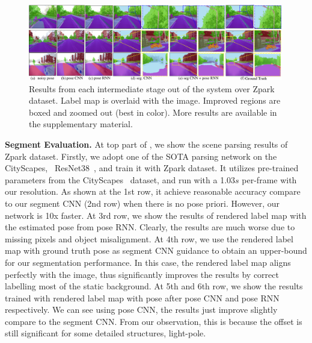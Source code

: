 \begin{figure}[!htbp]
\center
\vspace{-0.3\baselineskip}
\includegraphics[width=0.99\textwidth]{fig/results_v2.png}
   \caption{Results from each intermediate stage out of the system over Zpark dataset. Label map is overlaid with the image. Improved regions are boxed and zoomed out (best in color). More results are available in the supplementary material.}
\label{fig:results}
\vspace{-1.2\baselineskip}
\end{figure}
\textbf{Segment Evaluation.}
At top part of , we show the scene parsing results of Zpark dataset. 
Firstly, we adopt one of the SOTA parsing network on the CityScapes, \ie~ResNet38~\cite{WuSH16e}, and train it with Zpark dataset. It utilizes pre-trained parameters from the CityScapes~\cite{Cordts2016Cityscapes} dataset, and run with a 1.03$s$ per-frame with our resolution. 
As shown at the 1st row, it achieve reasonable accuracy compare to our segment CNN (2nd row) when there is no pose priori. However, our network is 10x faster. 
At 3rd row, we show the results of rendered label map with the estimated pose from pose RNN. Clearly, the results are much worse due to missing pixels and object misalignment.
At 4th row, we use the rendered label map with ground truth pose as segment CNN guidance to obtain an upper-bound for our segmentation performance. 
In this case, the rendered label map aligns perfectly with the image, thus significantly improves the results by correct labelling most of the static background.
At 5th and 6th row, we show the results trained with rendered label map with pose after pose CNN and pose RNN respectively. We can see using pose CNN, the results just improve slightly compare to the segment CNN. From our observation, this is because the offset is still significant for some detailed structures, \eg light-pole.

